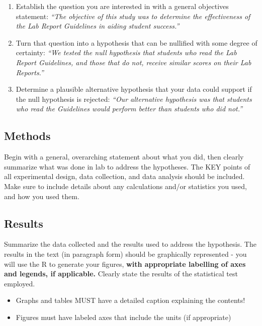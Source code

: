 \documentclass[11pt,]{article}
\providecommand{\tightlist}{%
  \setlength{\itemsep}{0pt}\setlength{\parskip}{0pt}}
\begin{document}
\begin{enumerate}
\def\labelenumi{\arabic{enumi}.}
\item
  Establish the question you are interested in with a general objectives
  statement: \emph{``The objective of this study was to determine the
  effectiveness of the Lab Report Guidelines in aiding student
  success.''}
\item
  Turn that question into a hypothesis that can be nullified with some
  degree of certainty: \emph{``We tested the null hypothesis that
  students who read the Lab Report Guidelines, and those that do not,
  receive similar scores on their Lab Reports.''}
\item
  Determine a plausible alternative hypothesis that your data could
  support if the null hypothesis is rejected: \emph{``Our alternative
  hypothesis was that students who read the Guidelines would perform
  better than students who did not.''}
\end{enumerate}

\hypertarget{methods}{%
\subsection{Methods}\label{methods}}

Begin with a general, overarching statement about what you did, then
clearly summarize what was done in lab to address the hypotheses. The
KEY points of all experimental design, data collection, and data
analysis should be included. Make sure to include details about any
calculations and/or statistics you used, and how you used them.

\hypertarget{results}{%
\subsection{Results}\label{results}}

Summarize the data collected and the results used to address the
hypothesis. The results in the text (in paragraph form) should be
graphically represented - you will use the R to generate your figures,
\textbf{with appropriate labelling of axes and legends, if applicable.}
Clearly state the results of the statistical test employed.

\begin{itemize}
\tightlist
\item
  Graphs and tables MUST have a detailed caption explaining the
  contents!
\item
  Figures must have labeled axes that include the units (if appropriate)
\end{itemize}
\end{document}
